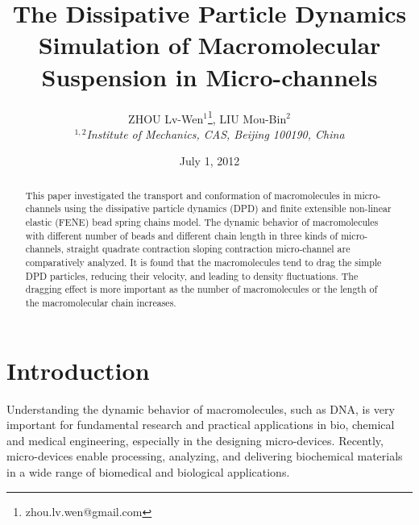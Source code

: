 \documentclass[12pt,a4paper]{article}   %
\begin{document}
\title{The Dissipative Particle Dynamics Simulation of Macromolecular Suspension in Micro-channels}     %

\author{ZHOU Lv-Wen$^1$\footnote{zhou.lv.wen@gmail.com}, LIU Mou-Bin$^2$\\          
       \textit{$^{1,2}$Institute of Mechanics, CAS, Beijing 100190, China}}
\date{July 1, 2012}                     %
\maketitle
\thispagestyle{fancy}                   %

\begin{abstract}                        %
This paper investigated the transport and conformation of macromolecules in micro-channels using the dissipative particle dynamics (DPD) and finite extensible non-linear elastic (FENE) bead spring chains model. The dynamic behavior of macromolecules with different number of beads and different chain length in three kinds of micro-channels, straight quadrate contraction sloping contraction micro-channel are comparatively analyzed. It is found that the macromolecules tend to drag the simple DPD particles, reducing their velocity, and leading to density fluctuations. The dragging effect is more important as the number of macromolecules or the length of the macromolecular chain increases.
\end{abstract}

\section{Introduction}                  %
 Understanding the dynamic behavior of macromolecules, such as DNA, is very important for fundamental research and practical applications in bio, chemical and medical engineering, especially in the designing micro-devices. Recently, micro-devices enable processing, analyzing, and delivering biochemical materials in a wide range of biomedical and biological applications\cite{KChun,FanX}.

\end{document}

